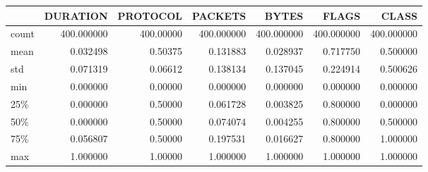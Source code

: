 \begin{tabular}{lrrrrrr}
\toprule
{} &    DURATION &   PROTOCOL &     PACKETS &       BYTES &       FLAGS &       CLASS \\
\midrule
count &  400.000000 &  400.00000 &  400.000000 &  400.000000 &  400.000000 &  400.000000 \\
mean  &    0.032498 &    0.50375 &    0.131883 &    0.028937 &    0.717750 &    0.500000 \\
std   &    0.071319 &    0.06612 &    0.138134 &    0.137045 &    0.224914 &    0.500626 \\
min   &    0.000000 &    0.00000 &    0.000000 &    0.000000 &    0.000000 &    0.000000 \\
25\%   &    0.000000 &    0.50000 &    0.061728 &    0.003825 &    0.800000 &    0.000000 \\
50\%   &    0.000000 &    0.50000 &    0.074074 &    0.004255 &    0.800000 &    0.500000 \\
75\%   &    0.056807 &    0.50000 &    0.197531 &    0.016627 &    0.800000 &    1.000000 \\
max   &    1.000000 &    1.00000 &    1.000000 &    1.000000 &    1.000000 &    1.000000 \\
\bottomrule
\end{tabular}
